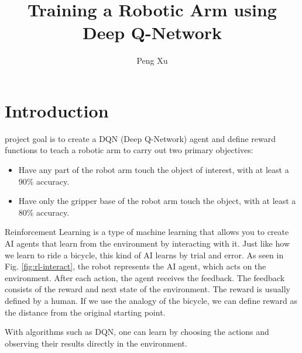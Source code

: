 \documentclass[10pt,journal,compsoc]{IEEEtran}
\begin{document}
\title{Training a Robotic Arm using Deep Q-Network}

\author{Peng Xu}

%
{}


\maketitle
\IEEEdisplaynontitleabstractindextext
\IEEEpeerreviewmaketitle
\section{Introduction}
\label{sec:introduction}

 project goal is to create a DQN (Deep Q-Network) agent and define reward functions to teach a robotic arm to carry out two primary objectives:

\begin{itemize}
    \item Have any part of the robot arm touch the object of interest, with at least a 90\% accuracy.
    \item Have only the gripper base of the robot arm touch the object, with at least a 80\% accuracy.
\end{itemize}

Reinforcement Learning is a type of machine learning that allows you to create AI agents that learn from the environment by interacting with it. Just like how we learn to ride a bicycle, this kind of AI learns by trial and error. As seen in Fig. \ref{fig:rl-interact}, the robot represents the AI agent, which acts on the environment. After each action, the agent receives the feedback. The feedback consists of the reward and next state of the environment. The reward is usually defined by a human. If we use the analogy of the bicycle, we can define reward as the distance from the original starting point.

With algorithms such as DQN, one can learn by choosing the actions and observing their results directly in the environment.
\end{document}
